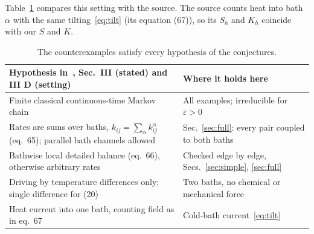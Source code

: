 \documentclass[11pt,a4paper]{article}
\theoremstyle{remark}\newtheorem{remark}[theorem]{Remark}
\newcommand{\eps}{\varepsilon}
\begin{document}
Table~\ref{tab:hyp} compares this setting with the source. The source counts heat into bath $\alpha$ with the same tilting~\eqref{eq:tilt} (its equation (67)), so its $S_h$ and $K_h$ coincide with our $S$ and $K$.
\begin{table}[tb]\centering\small
\begin{tabular}{p{}p{}}
\toprule
Hypothesis in~\cite{Ptaszynski2022}, Sec.~III (stated) and III D (setting) & Where it holds here\\
\midrule
Finite classical continuous-time Markov chain & All examples; irreducible for $\eps>0$\\
Rates are sums over baths, $k_{ij}=\sum_\alpha k^\alpha_{ij}$ (eq.~65); parallel bath channels allowed & Sec.~\ref{sec:full}: every pair coupled to both baths\\
Bathwise local detailed balance (eq.~66), otherwise arbitrary rates & Checked edge by edge, Secs.~\ref{sec:simple}, \ref{sec:full}\\
Driving by temperature differences only; single difference for (20) & Two baths, no chemical or mechanical force\\
Heat current into one bath, counting field as in eq.~67 & Cold-bath current~\eqref{eq:tilt}\\
\bottomrule
\end{tabular}
\caption{The counterexamples satisfy every hypothesis of the conjectures.}\label{tab:hyp}
\end{table}
\end{document}
